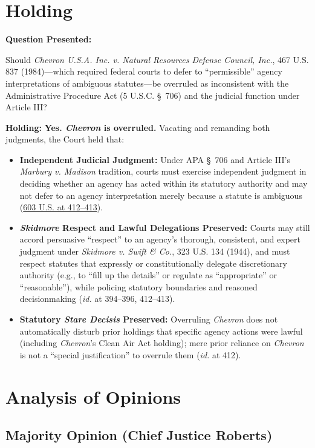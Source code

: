 \documentclass[12pt]{article}
\begin{document}
\section{Holding}
\textbf{Question Presented:}

Should \textit{Chevron U.S.A. Inc. v. Natural Resources Defense Council, Inc.}, 467 U.S. 837 (1984)---which required federal courts to defer to ``permissible'' agency interpretations of ambiguous statutes---be overruled as inconsistent with the Administrative Procedure Act (5 U.S.C. \S~706) and the judicial function under Article III?

\textbf{Holding:} \textbf{Yes. \textit{Chevron} is overruled.} Vacating and remanding both judgments, the Court held that:

\begin{itemize}
  \item \textbf{Independent Judicial Judgment:} Under APA \S~706 and Article III's \textit{Marbury v. Madison} tradition, courts must exercise independent judgment in deciding whether an agency has acted within its statutory authority and may not defer to an agency interpretation merely because a statute is ambiguous (\href{https://www.law.cornell.edu/supremecourt/text/22-451}{603 U.S. at 412--413}).
  \item \textbf{\textit{Skidmore} Respect and Lawful Delegations Preserved:} Courts may still accord persuasive ``respect'' to an agency's thorough, consistent, and expert judgment under \textit{Skidmore v. Swift \& Co.}, 323 U.S. 134 (1944), and must respect statutes that expressly or constitutionally delegate discretionary authority (e.g., to ``fill up the details'' or regulate as ``appropriate'' or ``reasonable''), while policing statutory boundaries and reasoned decisionmaking (\textit{id.} at 394--396, 412--413).
  \item \textbf{Statutory \textit{Stare Decisis} Preserved:} Overruling \textit{Chevron} does not automatically disturb prior holdings that specific agency actions were lawful (including \textit{Chevron}'s Clean Air Act holding); mere prior reliance on \textit{Chevron} is not a ``special justification'' to overrule them (\textit{id.} at 412).
\end{itemize}

\section{Analysis of Opinions}
\subsection{Majority Opinion (Chief Justice Roberts)}
\end{document}

